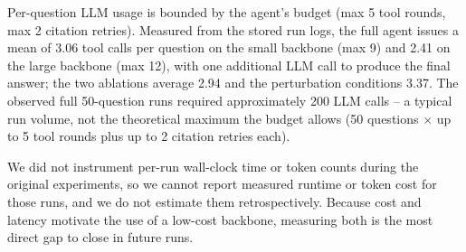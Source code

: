 \documentclass{article}
\begin{document}
Per-question LLM usage is bounded by the agent's budget (max 5 tool rounds, max
2 citation retries). Measured from the stored run logs, the full agent issues a
mean of 3.06 tool calls per question on the small backbone (max 9) and 2.41 on
the large backbone (max 12), with one additional LLM call to produce the final
answer; the two ablations average 2.94 and the perturbation conditions 3.37. The
observed full 50-question runs required approximately 200 LLM calls -- a typical
run volume, not the theoretical maximum the budget allows (50 questions $\times$
up to 5 tool rounds plus up to 2 citation retries each).

We did not instrument per-run wall-clock time or token counts during the
original experiments, so we cannot report measured runtime or token cost for
those runs, and we do not estimate them retrospectively. Because cost and
latency motivate the use of a low-cost backbone, measuring both is the most
direct gap to close in future runs.

\newpage

\end{document}
